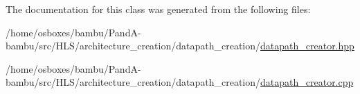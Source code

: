The documentation for this class was generated from the following files\+:\begin{DoxyCompactItemize}
\item 
/home/osboxes/bambu/\+Pand\+A-\/bambu/src/\+H\+L\+S/architecture\+\_\+creation/datapath\+\_\+creation/\hyperlink{datapath__creator_8hpp}{datapath\+\_\+creator.\+hpp}\item 
/home/osboxes/bambu/\+Pand\+A-\/bambu/src/\+H\+L\+S/architecture\+\_\+creation/datapath\+\_\+creation/\hyperlink{datapath__creator_8cpp}{datapath\+\_\+creator.\+cpp}\end{DoxyCompactItemize}
